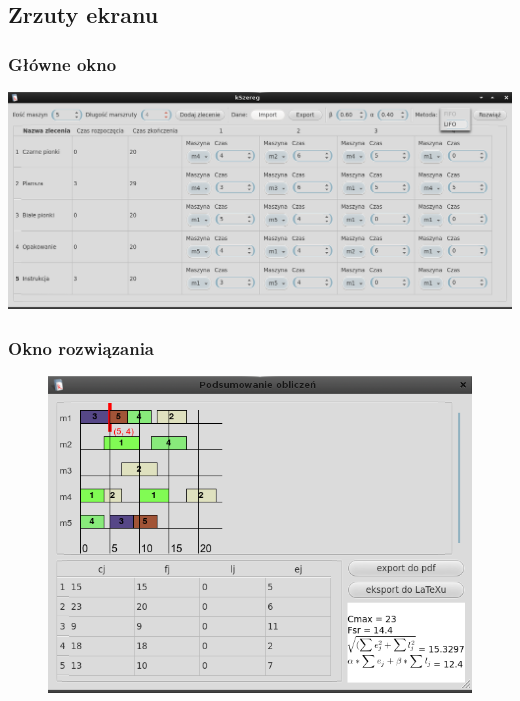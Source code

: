 \documentclass{prezentacja}
\begin{document}
\subsection{Zrzuty ekranu}
\def\ofset{1.4cm}
\hspace{-\ofset}
\begin{frame}
    \frametitle{\hspace{\ofset}Główne okno}
    \includegraphics[width=\paperwidth-.45cm, keepaspectratio=true]{./obrazki/s1}
\end{frame}
\begin{frame}
    \frametitle{Okno rozwiązania}
    \begin{figure}[htb]
        \centering
        \includegraphics[height=.8\textheight, keepaspectratio=true]{./obrazki/s2}
    \end{figure}    
\end{frame}
\end{document}
